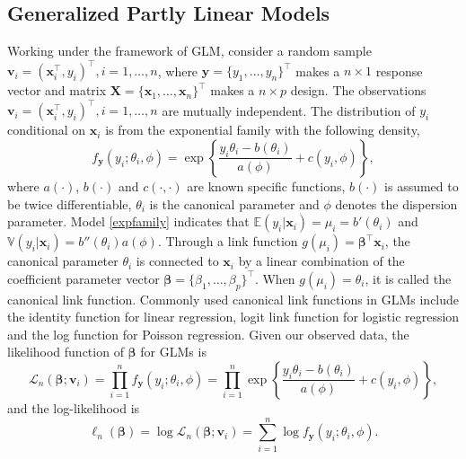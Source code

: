 \documentclass[11pt]{article}
\begin{document}
\subsection{Generalized Partly Linear Models} 
Working under the framework of GLM, consider a random sample $\textbf{v}_i = (\textbf{x}_i^\top,y_i)^\top,i=1,\ldots,n$, where 
$\textbf{y} = \{y_1,\ldots,y_n \}^\top$ makes a $n \times 1$ response vector  and  matrix $\textbf{X}=\{\textbf{x}_1,\ldots,\textbf{x}_n\}^\top$ makes a $n \times p$ design. The observations $\textbf{v}_i = (\textbf{x}_i^\top,y_i)^\top,i=1,\ldots,n$ are mutually independent. 
The distribution of $y_i$ conditional on $\textbf{x}_i$ is from the exponential family with the following density, 
\begin{equation}\label{expfamily}
f_\textbf{y}(y_i;\theta_i, \phi) =\exp\left\{ \frac{y_i\theta_i - b(\theta_i)}{a(\phi)}+ c(y_i,\phi) \right\},
\end{equation}
where $a(\cdot)$, $b(\cdot)$ and $c(\cdot,\cdot)$ are known specific functions, $b(\cdot)$ is assumed to be twice differentiable, $\theta_i$ is the canonical parameter and $\phi$ denotes the dispersion parameter. Model \eqref{expfamily} indicates that $\mathbb{E}(y_i | \textbf{x}_i) =\mu_i = b'(\theta_i)$ and $\mathbb{V}(y_i | \textbf{x}_i) = b''(\theta_i) a(\phi)$.  Through a link function $g(\mu_i) = \boldsymbol{\beta}^\top \textbf{x}_i$, the canonical parameter $\theta_i$ is connected to $\textbf{x}_i$ by a linear combination of the coefficient parameter vector $\boldsymbol{\beta} = \{\beta_1,\ldots,\beta_p \}^\top$. When $g(\mu_i) = \theta_i$, it is called the canonical link function. Commonly used canonical link functions in GLMs include the identity function for linear regression, logit link function for logistic regression and the log function for Poisson regression. Given our observed data, the likelihood function of $\boldsymbol{\beta}$ for GLMs is
$$
\mathcal{L}_n(\boldsymbol{\beta}; \textbf{v}_i) = \prod^n_{i=1} f_\textbf{y}(y_i;\theta_i, \phi) = \prod^n_{i=1} \exp\left\{ \frac{y_i\theta_i - b(\theta_i)}{a(\phi)}+ c(y_i,\phi) \right\},
$$
and the log-likelihood is
$$
\ell_n(\boldsymbol{\beta}) = \log \mathcal{L}_n(\boldsymbol{\beta};\textbf{v}_i) = \sum^n_{i=1} \log f_\textbf{y}(y_i;\theta_i, \phi).
$$
\end{document}
